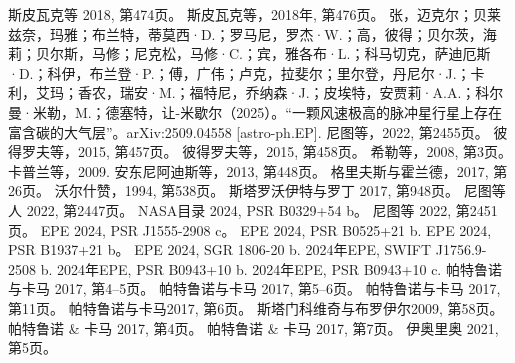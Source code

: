 \begin{enumerate}
 斯皮瓦克等 2018, 第474页。
 斯皮瓦克等，2018年, 第476页。
 张，迈克尔；贝莱兹奈，玛雅；布兰特，蒂莫西·D.；罗马尼，罗杰·W.；高，彼得；贝尔茨，海莉；贝尔斯，马修；尼克松，马修·C.；宾，雅各布·L.；科马切克，萨迪厄斯·D.；科伊，布兰登·P.；傅，广伟；卢克，拉斐尔；里尔登，丹尼尔·J.；卡利，艾玛；香农，瑞安·M.；福特尼，乔纳森·J.；皮埃特，安贾莉·A.A.；科尔曼·米勒，M.；德塞特，让-米歇尔（2025）。“一颗风速极高的脉冲星行星上存在富含碳的大气层”。arXiv:2509.04558 [astro-ph.EP].
 尼图等，2022, 第2455页。
 彼得罗夫等，2015, 第457页。
 彼得罗夫等，2015, 第458页。
 希勒等，2008, 第3页。
 卡普兰等，2009.
 安东尼阿迪斯等，2013, 第448页。
 格里夫斯与霍兰德，2017, 第26页。
 沃尔什赞，1994, 第538页。
 斯塔罗沃伊特与罗丁 2017, 第948页。
 尼图等人 2022, 第2447页。
 NASA目录 2024, PSR B0329+54 b。
 尼图等 2022, 第2451页。
 EPE 2024, PSR J1555-2908 c。
 EPE 2024, PSR B0525+21 b.
 EPE 2024, PSR B1937+21 b。
 EPE 2024, SGR 1806-20 b.
 2024年EPE, SWIFT J1756.9-2508 b.
 2024年EPE, PSR B0943+10 b.
 2024年EPE, PSR B0943+10 c.
 帕特鲁诺与卡马 2017, 第4–5页。
 帕特鲁诺与卡马 2017, 第5–6页。
 帕特鲁诺与卡马 2017, 第11页。
 帕特鲁诺与卡马2017, 第6页。
 斯塔门科维奇与布罗伊尔2009, 第58页。
 帕特鲁诺 & 卡马 2017, 第4页。
 帕特鲁诺 & 卡马 2017, 第7页。
 伊奥里奥 2021, 第5页。
 \end{enumerate}